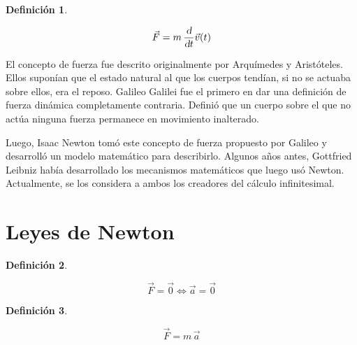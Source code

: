 \documentclass[a5paper,12pt,twoside]{book}
\newtheorem{defn}{{Definición}}[chapter]
\begin{document}
\begin{mdframed}[style=MyFrame1]
    \begin{defn}
        \label{defn:force}
    \end{defn}
    \begin{equation*}
        \Vec{F} = m \, \frac{\textsl{d}}{\textsl{d} t} \Vec{v}(t)
    \end{equation*}
\end{mdframed}

El concepto de fuerza fue descrito originalmente por Arquímedes y Aristóteles. Ellos suponían que el estado natural al que los cuerpos tendían, si no se actuaba sobre ellos, era el reposo. Galileo Galilei fue el primero en dar una definición de fuerza dinámica completamente contraria. Definió que un cuerpo sobre el que no actúa ninguna fuerza permanece en movimiento inalterado.

Luego, Isaac Newton tomó este concepto de fuerza propuesto por Galileo y desarrolló un modelo matemático para describirlo. Algunos años antes, Gottfried Leibniz había desarrollado los mecanismos matemáticos que luego usó Newton. Actualmente, se los considera a ambos los creadores del cálculo infinitesimal.


\section{Leyes de Newton}

\begin{mdframed}[style=MyFrame1]
    \begin{defn}
        \label{defn:NewtonFirstLaw}
    \end{defn}
    \begin{equation*}
        \Vec{F} = \vec{0} \iff \Vec{a} = \vec{0}
    \end{equation*}
\end{mdframed}

\begin{mdframed}[style=MyFrame1]
    \begin{defn}
        \label{defn:NewtonSecondLaw}
    \end{defn}
    \begin{equation*}
        \Vec{F} = m \, \Vec{a}
    \end{equation*}
\end{mdframed}
\end{document}
